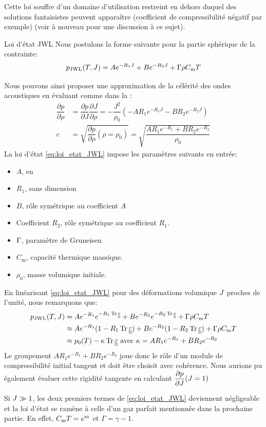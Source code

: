 \documentclass[10pt]{book}
\newcommand{\Cm}{C_{\mathrm{m}}}
\begin{document}
Cette loi souffre d'un domaine d'utilisation restreint en dehors duquel des solutions fantaisistes peuvent apparaître (coefficient de compressibilité négatif par exemple) (voir à nouveau \cite{menikoff2015jwl} pour une discussion à ce sujet).
\begin{Defi}{Loi d'état JWL} Nous postulons la forme suivante pour la partie sphérique de la contrainte:
\begin{equation}
p_{\mathrm{JWL}}(T,\J)=Ae^{-R_{1}J}+Be^{-R_{2}J}+\Gruneisen  \rho \Cm T
\label{eq:loi_etat_JWL}
\end{equation}
\end{Defi}
Nous pouvons ainsi proposer une approximation de la célérité des ondes acoustiques en évaluant comme dans la :
$$\begin{aligned}
\dfrac{\partial p}{\partial \rho}&=\dfrac{\partial p}{\partial J}\dfrac{\partial J}{\partial \rho}=-\dfrac{J^{2}}{\rho_{0}}\left(-AR_{1}e^{-R_{1}J}-BR_{2}e^{-R_{2}J}\right)\\
c&=\sqrt{\dfrac{\partial p}{\partial \rho}(\rho=\rho_{0})}=\sqrt{\dfrac{AR_{1}e^{-R_{1}}+BR_{2}e^{-R_{2}}}{\rho_{0}}}
\end{aligned}$$
La loi d'état \eqref{eq:loi_etat_JWL} impose les paramètres suivants en entrée:
\begin{itemize}
\item $A$, en \pascal
\item $R_{1}$, sans dimension
\item $B$, rôle symétrique au coefficient $A$
\item Coefficient $R_{2}$, rôle symétrique au coefficient $R_{1}$.
\item $\Gamma$, paramètre de Gruneisen
\item $\Cm$, capacité thermique massique.
\item $\rho_{0}$, masse volumique initiale.
\end{itemize}
En linéarisant \eqref{eq:loi_etat_JWL} pour des déformations volumique $J$ proches de l'unité, nous remarquons que:
$$\begin{aligned}
p_{\mathrm{JWL}}(T,\J)&=Ae^{-R_{1}}e^{-R_{1}\tr\DefoHPP}+Be^{-R_{2}}e^{-R_{2}\tr\DefoHPP}+\Gruneisen  \rho \Cm T\\
&\approx Ae^{-R_{1}}(1-R_{1}\tr\DefoHPP)+Be^{-R_{2}}(1-R_{2}\tr\DefoHPP)+\Gruneisen  \rho \Cm T\\
&\approx p_{0}(T)-\BulkModulus \tr\DefoHPP \avec \BulkModulus = AR_{1}e^{-R_{1}}+BR_{2}e^{-R_{2}}
\end{aligned}$$
Le groupement $AR_{1}e^{-R_{1}}+BR_{2}e^{-R_{2}}$ joue donc le rôle d'un module de compressibilité initial tangent et doit être choisit avec cohérence. Nous aurions pu également évaluer cette rigidité tangente en calculant $\dfrac{\partial p}{\partial J}(J=1)$
\begin{Rem}{Si $J \gg 1$, les deux premiers termes de \eqref{eq:loi_etat_JWL} deviennent négligeable et la loi d'état se ramène à celle d'un gaz parfait mentionnée dans la prochaine partie. En effet, $\Cm T =\EIntMass$ et $\Gamma = \gamma - 1$.}\end{Rem}
\end{document}
